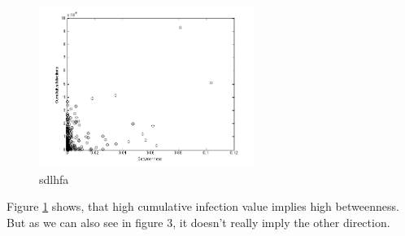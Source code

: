 \begin{figure}
\includegraphics[width=7cm]{influ4}
\caption{sdlhfa}
\label{Betweenness}
\end{figure}

Figure \ref{Betweenness} shows, that high cumulative infection value implies high betweenness. But as we can also see in figure 3, it doesn't really imply the other direction.





